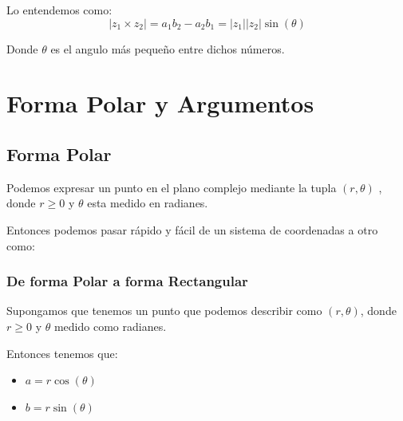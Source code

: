 \documentclass[12pt, fleqn]{report}                             %
\newcommand{\Wrap}[1]{\left( #1 \right)}                        %
\newcommand{\Cos}[1]{\cos\Wrap{#1}}                             %
\newcommand{\Sin}[1]{\sin\Wrap{#1}}                             %
\begin{document}
                Lo entendemos como:
                \begin{equation}
                    |z_1 \times z_2|
                        = a_1 b_2 - a_2 b_1 
                        = |z_1||z_2| \Sin{\theta}
                \end{equation}

                Donde $\theta$ es el angulo más pequeño entre dichos números.









    \chapter{Forma Polar y Argumentos}

        \clearpage
        \section{Forma Polar}
            
            Podemos expresar un punto en el plano complejo mediante la tupla $(r, \theta)$ , donde
            $r \geq 0$ y $\theta$ esta medido en radianes.

            Entonces podemos pasar rápido y fácil de un sistema de coordenadas a otro como:

            \subsection{De forma Polar a forma Rectangular}

                Supongamos que tenemos un punto que podemos describir como $(r, \theta)$,
                donde $r \geq 0$ y $\theta$ medido como radianes.

                Entonces tenemos que:

                \begin{itemize}
                     \item $a = r \Cos{\theta}$
                     \item $b = r \Sin{\theta}$
                 \end{itemize}
\end{document}
